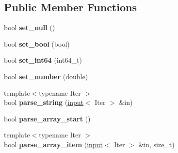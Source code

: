\subsection*{Public Member Functions}
\begin{DoxyCompactItemize}
\item 
bool {\bfseries set\+\_\+null} ()\hypertarget{classpangolin_1_1json_1_1null__parse__context_a31bde18a5e217d3915d94bf513ca27ad}{}\label{classpangolin_1_1json_1_1null__parse__context_a31bde18a5e217d3915d94bf513ca27ad}

\item 
bool {\bfseries set\+\_\+bool} (bool)\hypertarget{classpangolin_1_1json_1_1null__parse__context_aae394c11180911f2b36b1e87373b6c0a}{}\label{classpangolin_1_1json_1_1null__parse__context_aae394c11180911f2b36b1e87373b6c0a}

\item 
bool {\bfseries set\+\_\+int64} (int64\+\_\+t)\hypertarget{classpangolin_1_1json_1_1null__parse__context_a2bacec0a063c83769d474fe839fd4f9b}{}\label{classpangolin_1_1json_1_1null__parse__context_a2bacec0a063c83769d474fe839fd4f9b}

\item 
bool {\bfseries set\+\_\+number} (double)\hypertarget{classpangolin_1_1json_1_1null__parse__context_a0522daf76a26b977cd9e9d42372dcc47}{}\label{classpangolin_1_1json_1_1null__parse__context_a0522daf76a26b977cd9e9d42372dcc47}

\item 
{\footnotesize template$<$typename Iter $>$ }\\bool {\bfseries parse\+\_\+string} (\hyperlink{classpangolin_1_1json_1_1input}{input}$<$ Iter $>$ \&in)\hypertarget{classpangolin_1_1json_1_1null__parse__context_a821f494ff14dd8ef58fb64d2b2aeb286}{}\label{classpangolin_1_1json_1_1null__parse__context_a821f494ff14dd8ef58fb64d2b2aeb286}

\item 
bool {\bfseries parse\+\_\+array\+\_\+start} ()\hypertarget{classpangolin_1_1json_1_1null__parse__context_ac4c51f70fac6ed02766719829c2a4bde}{}\label{classpangolin_1_1json_1_1null__parse__context_ac4c51f70fac6ed02766719829c2a4bde}

\item 
{\footnotesize template$<$typename Iter $>$ }\\bool {\bfseries parse\+\_\+array\+\_\+item} (\hyperlink{classpangolin_1_1json_1_1input}{input}$<$ Iter $>$ \&in, size\+\_\+t)\hypertarget{classpangolin_1_1json_1_1null__parse__context_ac34150003894503e4799e88164af510c}{}\label{classpangolin_1_1json_1_1null__parse__context_ac34150003894503e4799e88164af510c}


\end{DoxyCompactItemize}
